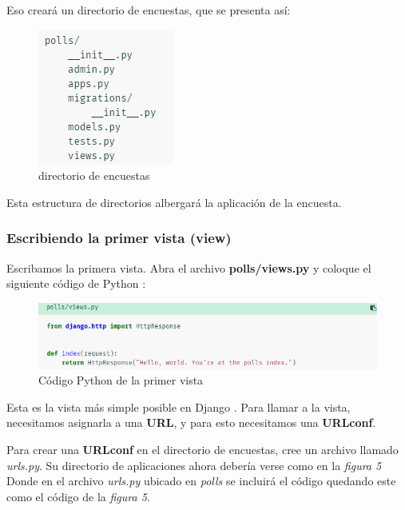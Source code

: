 \documentclass[10pt]{article}
\newcommand{\py}[1]{{\textcolor{B}{Python} #1}}
\newcommand{\django}[1]{{\textcolor{G}{Django} #1}}
\begin{document}
Eso creará un directorio de encuestas, que se presenta así:

\begin{figure}[H]
  \begin{center}
  	 \includegraphics{figuras/3/31/313/img1.png}	 
	 \renewcommand{\arraystretch}{1.3}
	 \caption{directorio de encuestas}
  \end{center}
\end{figure}


Esta estructura de directorios albergará la aplicación de la encuesta.

\subsubsection{Escribiendo la primer vista (view)}

Escribamos la primera vista. Abra el archivo \textbf{polls/views.py} y coloque el siguiente código de \py{}:

\begin{figure}[H]
  \begin{center}
  	 \includegraphics{figuras/3/31/314/img1.png}	 
	 \renewcommand{\arraystretch}{1.3}
	 \caption{Código \py{} de la primer vista}
  \end{center}
\end{figure}


Esta es la vista más simple posible en \django{}. Para llamar a la vista, necesitamos asignarla a una \textbf{URL}, y para esto necesitamos una \textbf{URLconf}.

Para crear una \textbf{URLconf} en el directorio de encuestas, cree un archivo llamado \textit{urls.py}. Su directorio de aplicaciones ahora debería verse como en la \textit{figura 5}
Donde en el archivo \textit{urls.py} ubicado en \textit{polls} se incluirá el código quedando este como el código de la \textit{figura 5}.
\end{document}
